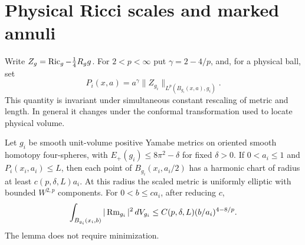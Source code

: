 \section{Physical Ricci scales and marked annuli}\label{sec:ricci-scales}

Write \(Z_g=\operatorname{Ric}_g-\tfrac14 R_g g\). For \(2<p<\infty\) put
\(\gamma=2-4/p\), and, for a physical ball, set
\[
 P_i(x,a)=a^\gamma\|Z_{g_i}\|_{L^p(B_{g_i}(x,a),g_i)}.
\]
This quantity is invariant under simultaneous constant rescaling of
metric and length. In general it changes under the conformal
transformation used to locate physical volume.

\begin{lemma}\label{lem:ricci-radius}
Let \(g_i\) be smooth unit-volume positive Yamabe metrics on oriented
smooth homotopy four-spheres, with \(E_+(g_i)\le8\pi^2-\delta\)
for fixed \(\delta>0\). If \(0<a_i\le1\) and \(P_i(x_i,a_i)\le L\),
then each point of \(B_{g_i}(x_i,a_i/2)\) has a harmonic chart of
radius at least \(c(p,\delta,L)a_i\). At this radius the scaled metric
is uniformly elliptic with bounded \(W^{2,p}\) components.
For \(0<b\le c a_i\), after reducing \(c\),
\begin{equation}\label{eq:ricci-mass}
 \int_{B_{g_i}(x_i,b)}|\operatorname{Rm}_{g_i}|^2\,dV_{g_i}
       \le C(p,\delta,L)(b/a_i)^{4-8/p}.
\end{equation}
The lemma does not require minimization.
\end{lemma}

